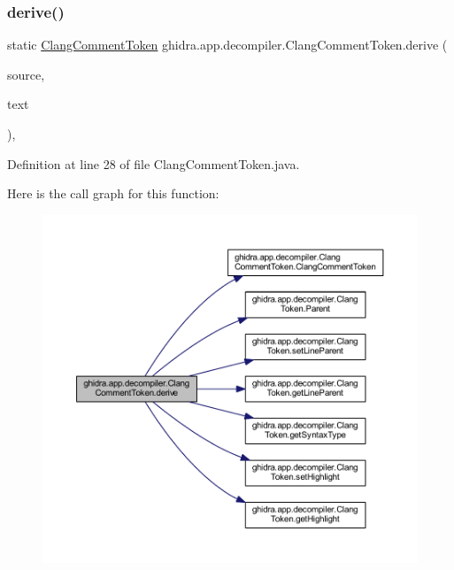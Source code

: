 \subsubsection{\texorpdfstring{derive()}{derive()}}
{\footnotesize\ttfamily static \mbox{\hyperlink{classghidra_1_1app_1_1decompiler_1_1_clang_comment_token}{Clang\+Comment\+Token}} ghidra.\+app.\+decompiler.\+Clang\+Comment\+Token.\+derive (\begin{DoxyParamCaption}\item[{\mbox{\hyperlink{classghidra_1_1app_1_1decompiler_1_1_clang_comment_token}{Clang\+Comment\+Token}}}]{source,  }\item[{String}]{text }\end{DoxyParamCaption})\hspace{0.3cm}{\ttfamily [inline]}, {\ttfamily [static]}}



Definition at line 28 of file Clang\+Comment\+Token.\+java.

Here is the call graph for this function\+:
\nopagebreak
\begin{figure}[H]
\begin{center}
\leavevmode
\includegraphics[width=350pt]{classghidra_1_1app_1_1decompiler_1_1_clang_comment_token_a8edaa235b8dac1e254bb1aa4bc0ef55c_cgraph}
\end{center}
\end{figure}
\mbox{\label{classghidra_1_1app_1_1decompiler_1_1_clang_comment_token_a53786dc2d9ec711ddb5c3c4864a651be}} 
